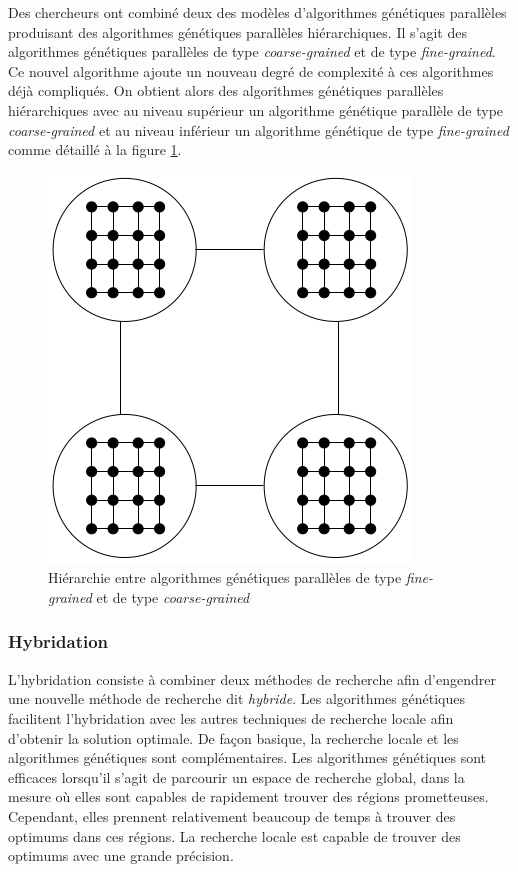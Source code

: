 	Des chercheurs \cite{cant2} ont combiné deux des modèles d'algorithmes génétiques parallèles produisant des algorithmes génétiques parallèles hiérarchiques. Il s'agit des algorithmes génétiques parallèles de type \emph{coarse-grained} et de type \emph{fine-grained}. Ce nouvel algorithme ajoute un nouveau degré de complexité à ces algorithmes déjà compliqués. On obtient alors des algorithmes génétiques parallèles hiérarchiques avec au niveau supérieur un algorithme génétique parallèle de type \emph{coarse-grained} et au niveau inférieur un algorithme génétique de type \emph{fine-grained} comme détaillé à la figure \ref{fig:hierar_fine_grained_fig}.
	
	\begin{figure}[!h]
		\begin{center}
			\includegraphics[scale=.3]{images/hierar_fine_grained_fig.png}
			\caption{Hiérarchie entre algorithmes génétiques parallèles de type \emph{fine-grained} et de type \emph{coarse-grained} \cite{cant2}}
			\label{fig:hierar_fine_grained_fig}
		\end{center}
	\end{figure} 
	
	\subsubsection{Hybridation}
	
	L'hybridation \cite{Goncalves} consiste à combiner deux méthodes de recherche afin d'engendrer une nouvelle méthode de recherche dit \emph{hybride}. Les algorithmes génétiques facilitent l'hybridation avec les autres techniques de recherche locale afin d'obtenir la solution optimale. De façon basique, la recherche locale et les algorithmes génétiques sont complémentaires. Les algorithmes génétiques sont efficaces lorsqu'il s'agit de parcourir un espace de recherche global, dans la mesure où elles sont capables de rapidement trouver des régions prometteuses. Cependant, elles prennent relativement beaucoup de temps à trouver des optimums dans ces régions. La recherche locale est capable de trouver des optimums avec une grande précision.
	
